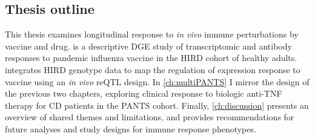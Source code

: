 \begin{outline}
%

\section{Thesis outline}

This thesis examines longitudinal response to \textit{in vivo} immune perturbations by vaccine and drug.
 is a descriptive \gls{DGE} study of transcriptomic and antibody responses to pandemic influenza vaccine in the \gls{HIRD} cohort of healthy adults.
 integrates \gls{HIRD} genotype data to map the regulation of expression response to vaccine using an \textit{in vivo} \gls{reQTL} design.
In \cref{ch:multiPANTS} I mirror the design of the previous two chapters, 
exploring clinical response to biologic anti-\gls{TNF} therapy for \gls{CD} patients in the \gls{PANTS} cohort.
Finally, \cref{ch:discussion} presents an overview of shared themes and limitations,
and provides recommendations for future analyses and study designs for immune response phenotypes.

\end{outline}
